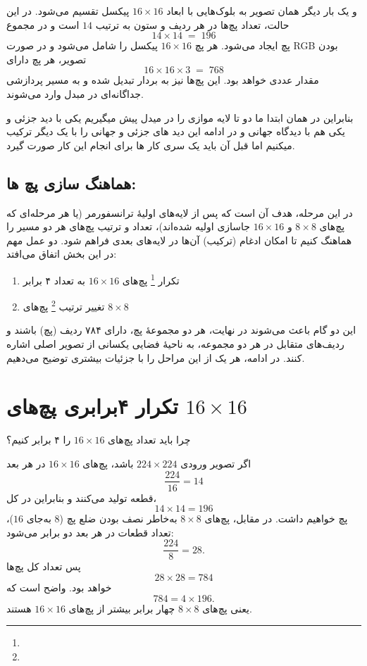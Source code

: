 و یک بار دیگر همان تصویر به بلوک‌هایی با ابعاد $16 \times 16$ پیکسل تقسیم می‌شود. در این حالت، تعداد پچ‌ها در هر ردیف و ستون به ترتیب 
$14$ است و در مجموع
\[
14 \times 14 \;=\; 196
\]
پچ ایجاد می‌شود. هر پچ $16 \times 16$ پیکسل را شامل می‌شود و در صورت RGB بودن تصویر، هر پچ دارای
\[
16 \times 16 \times 3 \;=\; 768
\]
مقدار عددی خواهد بود. این پچ‌ها نیز به بردار تبدیل شده و به مسیر پردازشی جداگانه‌ای در مبدل وارد می‌شوند.

بنابراین در همان ابتدا ما دو تا لایه موازی را در میدل پیش میگیریم
یکی با دید جزئی و یکی هم با دیدگاه جهانی و در ادامه این دید های جزئی و جهانی را با یک دیگر ترکیب میکنیم اما قبل آن باید یک سری کار ها برای انجام این کار صورت گیرد.

\subsection{هماهنگ سازی پچ ها:}

در این مرحله، هدف آن است که پس از لایه‌های اولیهٔ ترانسفورمر (یا هر مرحله‌ای که پچ‌های $8 \times 8$ و $16 \times 16$ جاسازی اولیه شده‌اند)، تعداد و ترتیب پچ‌های هر دو مسیر را هماهنگ کنیم تا امکان ادغام (ترکیب) آن‌ها در لایه‌های بعدی فراهم شود. دو عمل مهم در این بخش اتفاق می‌افتد:
\begin{enumerate}
\item تکرار \footnote{} پچ‌های \(16 \times 16\) به تعداد ۴ برابر

\item تغییر ترتیب \footnote{} پچ‌های \(8 \times 8\)

\end{enumerate}

این دو گام باعث می‌شوند در نهایت، هر دو مجموعهٔ پچ، دارای ۷۸۴ ردیف (پچ) باشند و ردیف‌های متقابل در هر دو مجموعه، به ناحیهٔ فضایی یکسانی از تصویر اصلی اشاره کنند. در ادامه، هر یک از این مراحل را با جزئیات بیشتری توضیح می‌دهیم.

\section*{تکرار ۴برابری پچ‌های \texorpdfstring{$16 \times 16$}{16x16}}

چرا باید تعداد پچ‌های $16 \times 16$ را ۴ برابر کنیم؟

اگر تصویر ورودی $224 \times 224$ باشد، پچ‌های $16 \times 16$ در هر بعد 
\[
\frac{224}{16} = 14
\]
قطعه تولید می‌کنند و بنابراین در کل، 
\[
14 \times 14 = 196
\]
پچ خواهیم داشت. در مقابل، پچ‌های $8 \times 8$ به‌خاطر نصف‌ بودن ضلع پچ ($8$ به‌جای $16$)، تعداد قطعات در هر بعد دو برابر می‌شود:
\[
\frac{224}{8} = 28.
\]
پس تعداد کل پچ‌ها 
\[
28 \times 28 = 784
\]
خواهد بود. واضح است که
\[
784 = 4 \times 196.
\]
یعنی پچ‌های $8 \times 8$ چهار برابر بیشتر از پچ‌های $16 \times 16$ هستند. 

